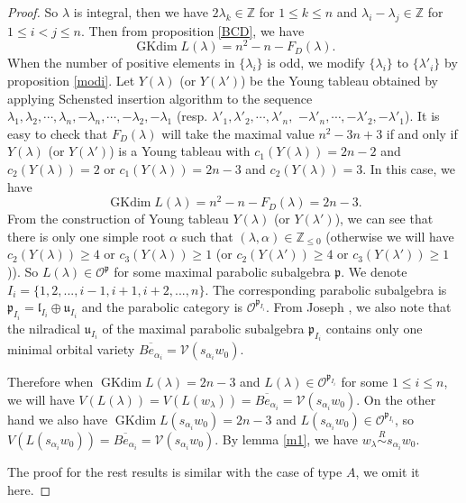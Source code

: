 \documentclass{amsart}[12pt]
\newcommand{\gkd}{\operatorname{GKdim}}
\numberwithin{equation}{section}
\begin{document}
\begin{proof}
So $\lambda$ is integral, then  we have  $2\lambda_k\in  \mathbb{Z}$ for $1\leq k\leq n $ and $\lambda_i-\lambda_j \in \mathbb{Z}$ for $1\leq i<j\leq n$.	
Then from proposition \ref{BCD}, we have
\[
\gkd L(\lambda)=n^2-n-F_D(\lambda).
\]
When the number of positive elements in $ \{\lambda_i \}$ is odd, we modify $ \{\lambda_i\} $ to $\{ \lambda'_i \}$ by proposition \ref{modi}.  Let $ Y(\lambda) $ (or $ Y(\lambda') $)  be the  Young tableau obtained by applying Schensted insertion algorithm to the sequence $
\lambda_1,\lambda_2,\cdots,\lambda_n,-\lambda_n,\cdots,-\lambda_2,-\lambda_1$ (resp. $\lambda'_1, \lambda'_2,\cdots,\lambda'_n,$ $-\lambda'_n,\cdots, -\lambda'_2, -\lambda'_1$).	
It is easy to check that $F_D(\lambda)$  will take the maximal value $n^2-3n+3$ if and only if $ Y(\lambda) $ (or $ Y(\lambda') $) is a Young tableau with $c_1(Y(\lambda))=2n-2$ and  $c_2(Y(\lambda))=2$ or $c_1(Y(\lambda))=2n-3$ and  $c_2(Y(\lambda))=3$. In this case, we have \[
\gkd L(\lambda)=n^2-n-F_D(\lambda)=2n-3.
\]
From the construction of Young tableau $Y(\lambda) $ (or $ Y(\lambda') $), we can see that there is only one simple root $\alpha$ such that $(\lambda,\alpha)\in \mathbb{Z}_{\leq 0}$ (otherwise we will have $c_2(Y(\lambda))\geq 4$ or $c_3(Y(\lambda))\geq 1$ (or $c_2(Y(\lambda'))\geq 4$ or $c_3(Y(\lambda'))\geq 1$)).  So $L(\lambda)\in \mathscr{O}^{\mathfrak{p}}$ for some maximal parabolic subalgebra $\mathfrak{p}$. We denote $I_i=\{1,2,...,i-1,i+1,i+2,...,n\}$. The corresponding parabolic subalgebra is $\mathfrak{p}_{I_i}=\mathfrak{l}_{I_i}\oplus \mathfrak{u}_{I_i}$ and the parabolic category is  $\mathscr{O}^{\mathfrak{p}_{I_i}}$.
From Joseph \cite[Proposition 2.4]{Jo98}, we also note that the nilradical $\mathfrak{u}_{I_i}$ of the maximal parabolic subalgebra $\mathfrak{p}_{I_i}$  contains only one minimal orbital variety $\overline{Be_{\alpha_i}}=\mathcal{V}(s_{\alpha_i}w_0)$.

Therefore when $\gkd L(\lambda)=2n-3$ and $L(\lambda)\in \mathscr{O}^{\mathfrak{p}_{I_i}}$ for some $1\leq i\leq n$, we will have $V(L(\lambda))=V(L(w_{\lambda}))=\overline{Be_{\alpha_i}}=\mathcal{V}(s_{\alpha_i}w_0)$. On the other hand we also have $\gkd L(s_{\alpha_{i}}w_0)=2n-3$ and $L(s_{\alpha_{i}}w_0)\in \mathscr{O}^{\mathfrak{p}_{I_i}}$, so $V(L(s_{\alpha_{i}}w_0))=\overline{Be_{\alpha_i}}=\mathcal{V}(s_{\alpha_i}w_0)$. By lemma \ref{m1}, we have $w_{\lambda}\stackrel{R}{\sim}s_{\alpha_{i}}w_0$.


The proof for the rest results is similar with the case of type $A$, we omit it here.
\end{proof}
\end{document}
